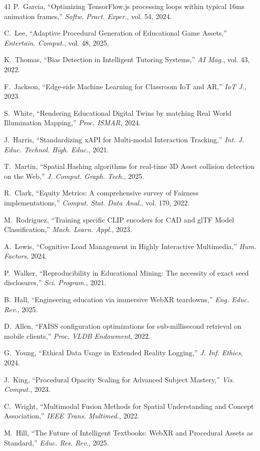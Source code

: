 \documentclass[conference]{IEEEtran}
\begin{document}
\begin{thebibliography}{41}
P.~Garcia, ``Optimizing TensorFlow.js processing loops within typical 16ms animation frames,'' \textit{Softw. Pract. Exper.}, vol. 54, 2024.

C.~Lee, ``Adaptive Procedural Generation of Educational Game Assets,'' \textit{Entertain. Comput.}, vol. 48, 2025.

K.~Thomas, ``Bias Detection in Intelligent Tutoring Systems,'' \textit{AI Mag.}, vol. 43, 2022.

F.~Jackson, ``Edge-side Machine Learning for Classroom IoT and AR,'' \textit{IoT J.}, 2023.

S.~White, ``Rendering Educational Digital Twins by matching Real World Illumination Mapping,'' \textit{Proc. ISMAR}, 2024.

J.~Harris, ``Standardizing xAPI for Multi-modal Interaction Tracking,'' \textit{Int. J. Educ. Technol. High. Educ.}, 2021.

T.~Martin, ``Spatial Hashing algorithms for real-time 3D Asset collision detection on the Web,'' \textit{J. Comput. Graph. Tech.}, 2025.

R.~Clark, ``Equity Metrics: A comprehensive survey of Fairness implementations,'' \textit{Comput. Stat. Data Anal.}, vol. 170, 2022.

M.~Rodriguez, ``Training specific CLIP encoders for CAD and glTF Model Classification,'' \textit{Mach. Learn. Appl.}, 2023.

A.~Lewis, ``Cognitive Load Management in Highly Interactive Multimedia,'' \textit{Hum. Factors}, 2024.

P.~Walker, ``Reproducibility in Educational Mining: The necessity of exact seed disclosures,'' \textit{Sci. Program.}, 2021.

B.~Hall, ``Engineering education via immersive WebXR teardowns,'' \textit{Eng. Educ. Rev.}, 2025.

D.~Allen, ``FAISS configuration optimizations for sub-millisecond retrieval on mobile clients,'' \textit{Proc. VLDB Endowment}, 2022.

G.~Young, ``Ethical Data Usage in Extended Reality Logging,'' \textit{J. Inf. Ethics}, 2024.

J.~King, ``Procedural Opacity Scaling for Advanced Subject Mastery,'' \textit{Vis. Comput.}, 2023.

C.~Wright, ``Multimodal Fusion Methods for Spatial Understanding and Concept Association,'' \textit{IEEE Trans. Multimed.}, 2022.

M.~Hill, ``The Future of Intelligent Textbooks: WebXR and Procedural Assets as Standard,'' \textit{Educ. Res. Rev.}, 2025.

\end{thebibliography}
\end{document}

